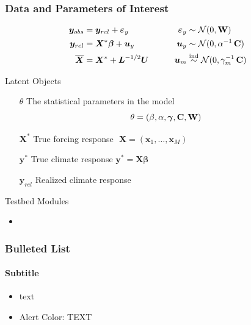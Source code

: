 \documentclass{beamer}
\newcommand{\C}{\ensuremath{\text{Cov}}}
\def\*#1{\bm{#1}}
\def\C{\textbf{\text{C}}}
\def\W{\textbf{\text{W}}}
\begin{document}
\begin{frame}
\frametitle{Data and Parameters of Interest}

\begin{block}{}
\vspace*{-\baselineskip}\setlength\belowdisplayshortskip{0pt}
\begin{alignat*}{3}
\*y_{obs} &= \*y_{rel} + \*\varepsilon_y  \qquad \quad &\*\varepsilon_y &\sim \mathcal N(0,\W)\\
\*y_{rel} &= \*X^* \*\beta + \*u_y \nonumber  \qquad  &\*u_y &\sim \mathcal N(0,\alpha^{-1}\,\C) \\
\overline{\*X} &= \*X^* + \*L^{-1/2} \*U \qquad    &\*u_m &\stackrel{\text{ind}}{\sim} \mathcal N(0,\gamma_m^{-1} \, \C)  \:
\end{alignat*}
\end{block}


\alert{Latent Objects}

\begin{itemize}
\item[$\theta$] The statistical parameters in the model
\[
\theta = (\beta, \alpha, \*\gamma, \C, \W)
\]
\item[$\*X^*$] True forcing response $\,\,\*X = (\*x_1, \dots, \*x_M)$
\item[$\*y^*$] True climate response $\*y^* = \*X \* \beta$
\item[$\*y_{rel}$] Realized climate response
\end{itemize}

\end{frame}



\begin{frame}
\alert{Testbed Modules}

\begin{itemize}
\item 
\end{itemize}

\end{frame}










\begin{frame}
\frametitle{Bulleted List}
  \framesubtitle{Subtitle}
  \begin{itemize}
  \item {} text
  \item \alert{Alert Color:} TEXT
  \end{itemize}  
\end{frame}
\end{document}

